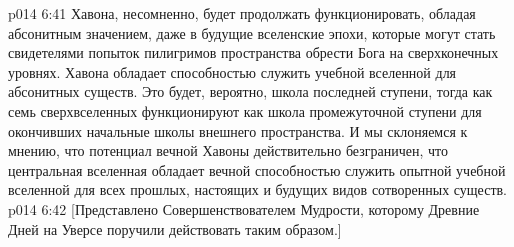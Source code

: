 \vs p014 6:41 \pc Хавона, несомненно, будет продолжать функционировать, обладая абсонитным значением, даже в будущие вселенские эпохи, которые могут стать свидетелями попыток пилигримов пространства обрести Бога на сверхконечных уровнях. Хавона обладает способностью служить учебной вселенной для абсонитных существ. Это будет, вероятно, школа последней ступени, тогда как семь сверхвселенных функционируют как школа промежуточной ступени для окончивших начальные школы внешнего пространства. И мы склоняемся к мнению, что потенциал вечной Хавоны действительно безграничен, что центральная вселенная обладает вечной способностью служить опытной учебной вселенной для всех прошлых, настоящих и будущих видов сотворенных существ.
\vsetoff
\vs p014 6:42 [Представлено Совершенствователем Мудрости, которому Древние Дней на Уверсе поручили действовать таким образом.]
